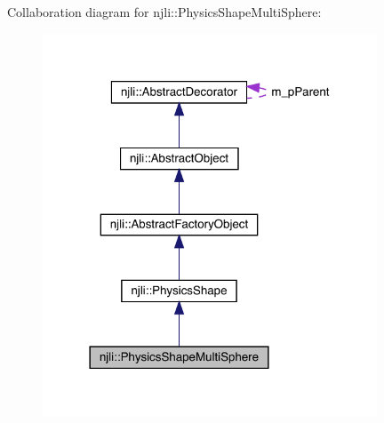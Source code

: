 Collaboration diagram for njli\+:\+:Physics\+Shape\+Multi\+Sphere\+:\nopagebreak
\begin{figure}[H]
\begin{center}
\leavevmode
\includegraphics[width=282pt]{classnjli_1_1_physics_shape_multi_sphere__coll__graph}
\end{center}
\end{figure}
